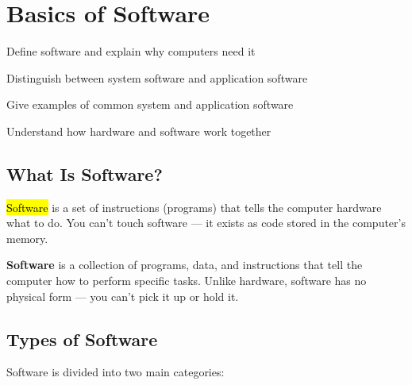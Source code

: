 
\chapter{Basics of Software}
\label{ch:software-basics}

\begin{objectives}
  \item Define software and explain why computers need it
  \item Distinguish between system software and application software
  \item Give examples of common system and application software
  \item Understand how hardware and software work together
\end{objectives}


\section{What Is Software?}
\label{sec:what-is-software}

\hl{Software} is a set of instructions (programs) that tells the computer hardware what to do. You can't touch software --- it exists as code stored in the computer's memory.

\begin{theorybox}
\textbf{Software} is a collection of programs, data, and instructions that tell the computer how to perform specific tasks. Unlike hardware, software has no physical form --- you can't pick it up or hold it.
\end{theorybox}

\section{Types of Software}
\label{sec:software-types}

Software is divided into two main categories:

